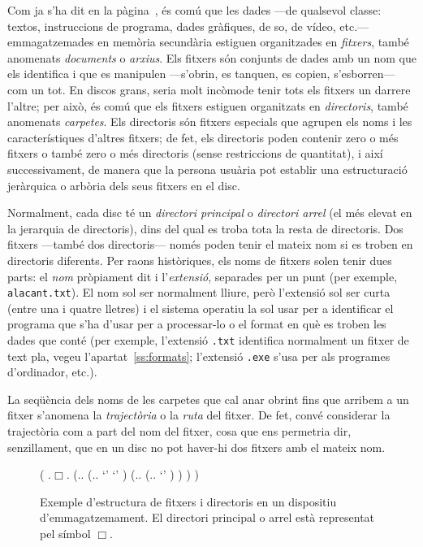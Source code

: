 Com ja s'ha dit en la pàgina~\pageref{pg:menciofitxer}, és comú que
les dades ---de qualsevol classe: textos, instruccions de programa,
dades gràfiques, de so, de vídeo, etc.--- emmagatzemades en memòria
secundària estiguen organitzades en {\em fitxers}, també anomenats
\emph{documents} o \emph{arxius}. Els fitxers són conjunts de dades
amb un nom que els identifica i que es manipulen ---s'obrin, es
tanquen, es copien, s'esborren--- com un tot. En discos grans, seria
molt incòmode tenir tots els fitxers un darrere l'altre; per això, és
comú que els fitxers estiguen organitzats en {\em directoris}, també
anomenats \emph{carpetes}. Els directoris són fitxers especials que
agrupen els noms i les característiques d'altres fitxers; de fet, els
directoris poden contenir zero o més fitxers o també zero o més
directoris (sense restriccions de quantitat), i així successivament,
de manera que la persona usuària pot establir una estructuració
jeràrquica o arbòria dels seus fitxers en el disc.

Normalment, cada disc té un {\em directori principal} o
\emph{directori arrel} (el més elevat en la jerarquia de directoris),
dins del qual es troba tota la resta de directoris. Dos fitxers
---també dos directoris--- només poden tenir el mateix nom si es
troben en directoris diferents. Per raons històriques, els noms de
fitxers solen tenir dues parts: el \emph{nom} pròpiament dit i
l'\emph{extensió}, separades per un punt (per exemple,
\texttt{alacant.txt}). El nom sol ser normalment lliure, però
l'extensió sol ser curta (entre una i quatre lletres) i el sistema
operatiu la sol usar per a identificar el programa que s'ha d'usar per
a processar-lo o el format en què es troben les dades que conté (per
exemple, l'extensió \texttt{.txt} identifica normalment un fitxer de
text pla, vegeu l'apartat~\ref{ss:formats}; l'extensió \texttt{.exe}
s'usa per als programes d'ordinador, etc.).

La seqüència dels noms de les carpetes que cal anar obrint fins que
arribem a un fitxer s'anomena la \emph{trajectòria} o la \emph{ruta}
del fitxer.  De fet, convé considerar la trajectòria com a part del
nom del fitxer, cosa que ens permetria dir, senzillament, que en un
disc no pot haver-hi dos fitxers amb el mateix nom.  

\begin{figure}
  \centering
  \begin{parsetree}
    ( .{$\Box$}.
    (.{}.
    (.{}.
    `'
    `'
    )
    (.{}.
    (.{}.
    `'
    )
    )
    )
    )
  \end{parsetree}
  \caption{Exemple d'estructura de fitxers i directoris en un
    dispositiu d'emmagatzemament. El directori principal o arrel està
    representat pel símbol $\Box$.}\label{fg:fitxersdirs}
\end{figure}

